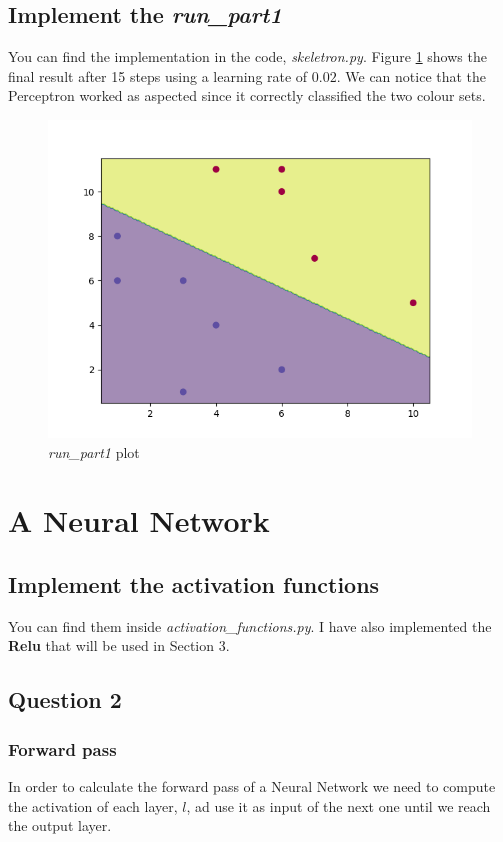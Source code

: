 \documentclass[11pt]{article}
\begin{document}
\subsection{Implement the \emph{run\_part1}}
You can find the implementation in the code, \emph{skeletron.py}. Figure \ref{fig:runPart1} shows the final result after 15 steps using a learning rate of $0.02$. We can notice that the Perceptron worked as aspected since it correctly classified the two colour sets.
\begin{figure}[H]
	\centering
	\includegraphics[scale=0.6]{images/run_part1}
	\caption{\emph{run\_part1} plot}
	\label{fig:runPart1}
\end{figure}

\section{A Neural Network}
\subsection{ Implement the activation functions}
You can find them inside \emph{activation\_functions.py}. I have also implemented the \textbf{Relu} that will be used in Section 3.
\subsection{Question 2}
\subsubsection{Forward pass}
In order to calculate the forward pass of a Neural Network we need to compute the activation of each layer, $l$, ad use it as input of the next one until we reach the output layer. 
\end{document}
